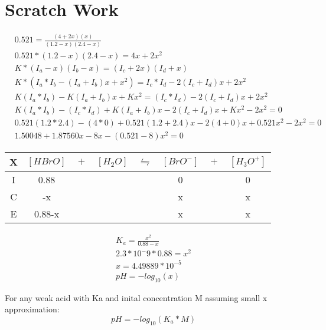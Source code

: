 \documentclass{article}  %
\begin{document}
\section*{Scratch Work}

\begin{equation*}
    \begin{aligned}
        &0.521 = \frac{(4+2x)(x)}{(1.2-x)(2.4-x)} \\
        &0.521 * (1.2-x)(2.4-x) = 4x+ 2x^2 \\ 
        &K * (I_a - x)(I_b - x) = (I_c + 2x)(I_d + x)\\
        &K * (I_a* I_b - (I_a + I_b)x + x^2) = I_c* I_d - 2(I_c + I_d)x + 2x^2 \\
        &K(I_a* I_b) - K(I_a + I_b)x + Kx^2 = (I_c* I_d) - 2(I_c + I_d)x + 2x^2 \\
        &K(I_a* I_b) - (I_c* I_d) + K(I_a + I_b)x - 2(I_c + I_d)x + Kx^2 - 2x^2 = 0 \\
        &0.521(1.2*2.4) - (4*0) + 0.521(1.2 + 2.4)x - 2(4+0)x + 0.521x^2 - 2x^2 = 0 \\
        &1.50048 + 1.87560x - 8x - (0.521-8)x^2 = 0
    \end{aligned}
\end{equation*}

\begin{tabular}{c|c@{}c@{}c@{}c@{}c@{}c@{}c}
    \hline
    X   & $[HBrO]$ & ${}+{}$ & $[H_2O]$ & ${}\leftrightharpoons{}$ & $[BrO^-]$ & ${}+{}$ & $[H_3O^+]$ \\
    \hline
    I   &  0.88    &&     &&  0   && 0  \\
    C   &   -x   &&     &&  x   &&  x \\
    E   &   0.88-x   &&     &&   x  && x  \\      
\end{tabular}

\begin{equation*}
    \begin{aligned}
        K_a = \frac{x^2}{0.88-x} \\
        2.3*10^-9 * 0.88 = x^2 \\
        x = 4.49889*10^{-5} \\
        pH = -log_{10}(x)     
    \end{aligned}
\end{equation*}

For any weak acid with Ka and inital concentration M assuming small x approximation:
\begin{equation}
    pH = - log_{10}(K_a*M)
\end{equation}
\end{document}
